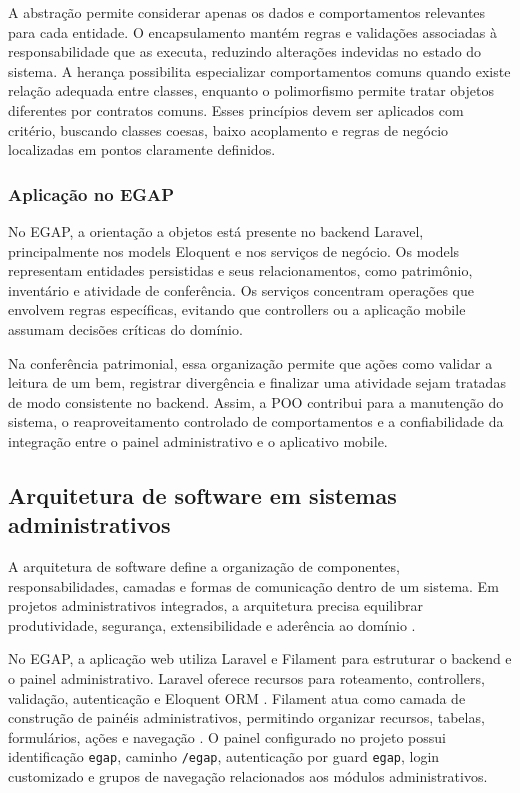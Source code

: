 \documentclass[12pt,a4paper]{article}
\begin{document}
A abstração permite considerar apenas os dados e comportamentos relevantes para cada entidade. O encapsulamento mantém regras e validações associadas à responsabilidade que as executa, reduzindo alterações indevidas no estado do sistema. A herança possibilita especializar comportamentos comuns quando existe relação adequada entre classes, enquanto o polimorfismo permite tratar objetos diferentes por contratos comuns. Esses princípios devem ser aplicados com critério, buscando classes coesas, baixo acoplamento e regras de negócio localizadas em pontos claramente definidos.

\subsubsection{Aplicação no EGAP}

No EGAP, a orientação a objetos está presente no backend Laravel, principalmente nos models Eloquent e nos serviços de negócio. Os models representam entidades persistidas e seus relacionamentos, como patrimônio, inventário e atividade de conferência. Os serviços concentram operações que envolvem regras específicas, evitando que controllers ou a aplicação mobile assumam decisões críticas do domínio.

Na conferência patrimonial, essa organização permite que ações como validar a leitura de um bem, registrar divergência e finalizar uma atividade sejam tratadas de modo consistente no backend. Assim, a POO contribui para a manutenção do sistema, o reaproveitamento controlado de comportamentos e a confiabilidade da integração entre o painel administrativo e o aplicativo mobile.

\subsection{Arquitetura de software em sistemas administrativos}

A arquitetura de software define a organização de componentes, responsabilidades, camadas e formas de comunicação dentro de um sistema. Em projetos administrativos integrados, a arquitetura precisa equilibrar produtividade, segurança, extensibilidade e aderência ao domínio \cite{pressman,sommerville}.

No EGAP, a aplicação web utiliza Laravel e Filament para estruturar o backend e o painel administrativo. Laravel oferece recursos para roteamento, controllers, validação, autenticação e Eloquent ORM \cite{laravel,eloquent}. Filament atua como camada de construção de painéis administrativos, permitindo organizar recursos, tabelas, formulários, ações e navegação \cite{filament}. O painel configurado no projeto possui identificação \texttt{egap}, caminho \texttt{/egap}, autenticação por guard \texttt{egap}, login customizado e grupos de navegação relacionados aos módulos administrativos.
\end{document}

